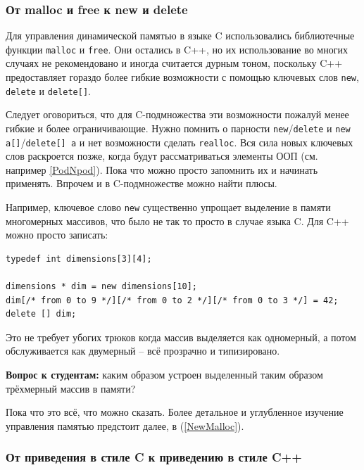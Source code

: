 \documentclass[a4paper,12pt,oneside]{article}
\newif\ifanswers
\begin{document}
\subsubsection{От malloc и free к new и delete}\label{newdelete}

Для управления динамической памятью в языке C использовались библиотечные функции \lstinline!malloc! и \lstinline!free!. Они остались в C++, но их использование во многих случаях не рекомендовано и иногда считается дурным тоном, поскольку C++ предоставляет гораздо более гибкие возможности с помощью ключевых слов \lstinline!new!, \lstinline!delete! и \lstinline!delete[]!.



Следует оговориться, что для C-подмножества эти возможности пожалуй менее гибкие и более ограничивающие. Нужно помнить о парности \lstinline!new!/\lstinline!delete! и \lstinline!new a[]!/\lstinline!delete[] a! и нет возможности сделать \lstinline!realloc!. Вся сила новых ключевых слов раскроется позже, когда будут рассматриваться элементы ООП (см. например \ref{PodNpod}). Пока что можно просто запомнить их и начинать применять. Впрочем и в C-подмножестве можно найти плюсы.

Например, ключевое слово \lstinline!new! существенно упрощает выделение в памяти многомерных массивов, что было не так то просто в случае языка C. Для C++ можно просто записать:

\begin{lstlisting}
typedef int dimensions[3][4];

dimensions * dim = new dimensions[10];
dim[/* from 0 to 9 */][/* from 0 to 2 */][/* from 0 to 3 */] = 42;
delete [] dim;
\end{lstlisting}

Это не требует убогих трюков когда массив выделяется как одномерный, а потом обслуживается как двумерный -- всё прозрачно и типизировано.

\textbf{Вопрос к студентам:} каким образом устроен выделенный таким образом трёхмерный массив в памяти?

\ifanswers
Правильный ответ: это jagged-вектор из одномерных массивов с двумерным доступом к каждому
\fi

Пока что это всё, что можно сказать. Более детальное и углубленное изучение управления памятью предстоит далее, в (\ref{NewMalloc}).

\subsubsection{От приведения в стиле C к приведению в стиле C++}\label{FromCCastToCPP}
\end{document}
